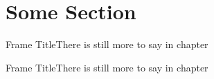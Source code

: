 \section{Some Section}

\begin{frame}{Frame Title}There is still more to say in chapter \ChapterNumber\end{frame}
\begin{frame}{Frame Title}There is still more to say in chapter \ChapterNumber\end{frame}
